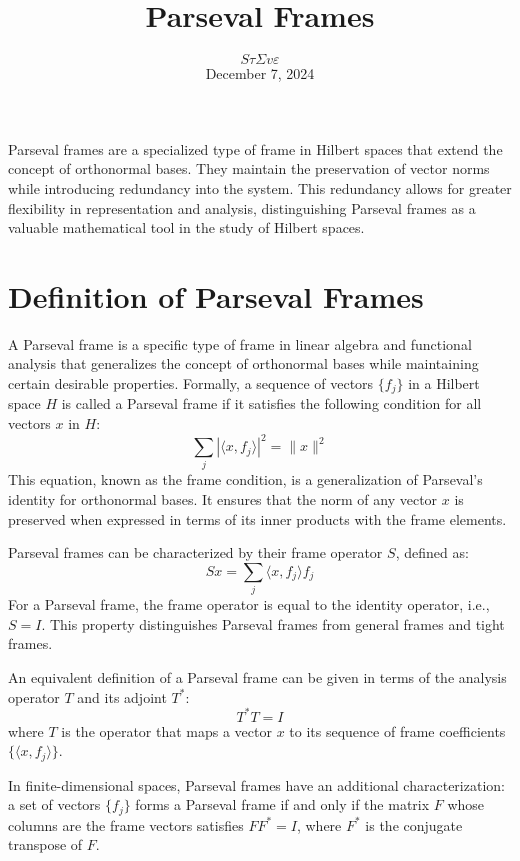 \documentclass{article}
\newcommand{\tmaffiliation}[1]{\\ #1}
\begin{document}
\title{Parseval Frames}

\author{
  $S \tau \Sigma v \varepsilon$
  \tmaffiliation{December 7, 2024}
}

\maketitle

Parseval frames are a specialized type of frame in Hilbert spaces that extend
the concept of orthonormal bases. They maintain the preservation of vector
norms while introducing redundancy into the system. This redundancy allows for
greater flexibility in representation and analysis, distinguishing Parseval
frames as a valuable mathematical tool in the study of Hilbert spaces.

\section{Definition of Parseval Frames}

A Parseval frame is a specific type of frame in linear algebra and functional
analysis that generalizes the concept of orthonormal bases while maintaining
certain desirable properties. Formally, a sequence of vectors $\{f_j \}$ in a
Hilbert space $H$ is called a Parseval frame if it satisfies the following
condition for all vectors $x$ in $H$:
\begin{equation}
  \sum_j | \langle x, f_j \rangle |^2 = \|x\|^2
\end{equation}
This equation, known as the frame condition, is a generalization of Parseval's
identity for orthonormal bases. It ensures that the norm of any vector $x$ is
preserved when expressed in terms of its inner products with the frame
elements.

Parseval frames can be characterized by their frame operator $S$, defined as:
\begin{equation}
  Sx = \sum_j \langle x, f_j \rangle f_j
\end{equation}
For a Parseval frame, the frame operator is equal to the identity operator,
i.e., $S = I$. This property distinguishes Parseval frames from general frames
and tight frames.

An equivalent definition of a Parseval frame can be given in terms of the
analysis operator $T$ and its adjoint $T^{\ast}$:
\[ T^{\ast} T = I \]
where $T$ is the operator that maps a vector $x$ to its sequence of frame
coefficients $\{\langle x, f_j \rangle\}$.

In finite-dimensional spaces, Parseval frames have an additional
characterization: a set of vectors $\{f_j \}$ forms a Parseval frame if and
only if the matrix $F$ whose columns are the frame vectors satisfies
$FF^{\ast} = I$, where $F^{\ast}$ is the conjugate transpose of $F$.
\end{document}
